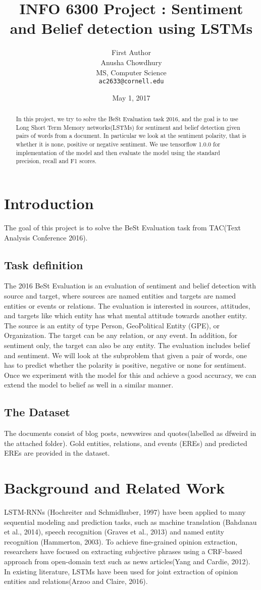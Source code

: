 \documentclass[11pt]{article}
\title{INFO 6300 Project : Sentiment and Belief detection using LSTMs}
\author{First Author \\
  Anusha Chowdhury \\
  MS, Computer Science \\
  {\tt ac2633@cornell.edu} 
}
\date{May 1, 2017}
\begin{document}
\maketitle
\begin{abstract}
In this project, we try to solve the BeSt Evaluation task 2016, and the goal is to use  
Long Short Term Memory networks(LSTMs) for sentiment and belief detection given pairs of words
from a document. In particular we look at the sentiment polarity, that is whether it is none,
positive or negative sentiment. We use tensorflow 1.0.0 for implementation of the model
and then evaluate the model using the standard precision, recall and F1 scores.
\end{abstract}

\section{Introduction}
The goal of this project is to solve the BeSt Evaluation task from TAC(Text Analysis Conference 2016).
\subsection{Task definition} 
The 2016 BeSt Evaluation is an evaluation of sentiment and belief detection with source and target, 
where sources are named entities and targets are named entities or events or relations.
The evaluation is interested in sources, attitudes, and targets like which entity has what mental attitude towards
another entity. The source is an entity of type Person, Geo­Political Entity (GPE), or Organization.  The
target can be any relation, or any event.  In addition, for sentiment only, the target can
also be any entity. 
The evaluation includes belief and sentiment. We will look at the subproblem that given a pair of words, one has 
to predict whether the polarity is positive, negative or none for sentiment. Once we experiment with the model for this
and achieve a good accuracy, we can extend the model to belief as well in a similar manner.
\subsection{The Dataset} 
The documents consist of blog posts, newswires and quotes(labelled as dfweird in the attached folder).
Gold entities, relations, and events (EREs) and predicted EREs are provided in the dataset.
\section{Background and Related Work}
LSTM-RNNs  (Hochreiter  and  Schmidhuber, 1997)  have  been  applied  to  many  
sequential   modeling   and   prediction   tasks,   such as  machine  translation  
(Bahdanau  et  al.,  2014),    speech   recognition (Graves  et  al.,  2013) and  
named entity recognition (Hammerton,  2003).
To achieve fine-grained   opinion   extraction, researchers have focused on extracting subjective 
phrases using a CRF-based approach from open-domain  text  such  as  news  articles(Yang and Cardie, 2012). 
In existing literature, LSTMs have been used for joint extraction of opinion entities 
and relations(Arzoo and Claire, 2016).
\end{document}
